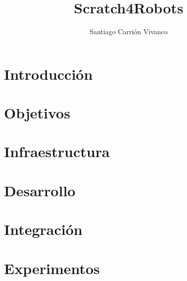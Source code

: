 \documentclass{new_cit_thesis}
\begin{document}
\title{Scratch4Robots}
\author{Santiago Carrión Vivanco}
\address{Tutor: Jose Maria Cañas Plaza} 
\copyyear{\the\year}                               
\pubnum{}                                          
\dedication{}  		   


\maketitle

\cleardoublepage


\cleardoublepage
\pagestyle{plain}
\chapter{Introducción}


\cleardoublepage
\chapter{Objetivos}


\cleardoublepage
\chapter{Infraestructura}


\cleardoublepage
\chapter{Desarrollo}


\cleardoublepage
\chapter{Integración}


\cleardoublepage
\chapter{Experimentos}

\end{document}
